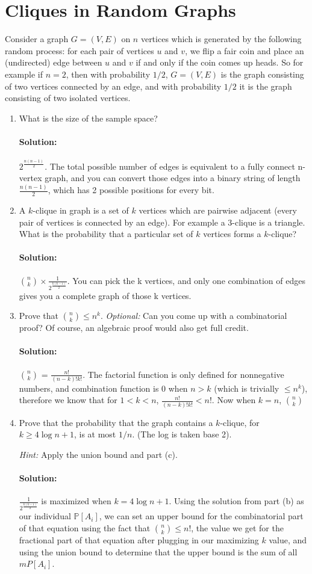 \documentclass[11pt, notitlepage]{article}
\newcommand{\mP}{\mathbb{P}}
\newcommand{\Question}[1]{\newpage\section{#1}}
\newenvironment{solution}{\paragraph{Solution:}}{\hfill \vspace{10mm}}
\begin{document}
\Question{Cliques in Random Graphs}

Consider a graph $G = (V,E)$ on $n$ vertices which is generated by the following random process: for each pair of vertices $u$ and $v$, we flip a fair coin and place an (undirected) edge between $u$ and $v$ if and only if the coin comes up heads. So for example if $n = 2$, then with probability $1/2$, $G = (V,E)$ is the graph consisting of two vertices connected by an edge, and with probability $1/2$ it is the graph consisting of two isolated vertices.

\begin{enumerate}[label=\alph*.)]
\item What is the size of the sample space?
\begin{solution}
	$2^{\frac{n(n-1)}{2}}$. The total possible number of edges is equivalent to a fully connect n-vertex graph, and you can convert those edges into a binary string of length $\frac{n(n-1)}{2}$, which has 2 possible positions for every bit.
\end{solution}
\item A $k$-clique in graph is a set of $k$ vertices which are pairwise adjacent (every pair of vertices is connected by an edge). For example a $3$-clique is a triangle. What is the probability that a particular
set of $k$ vertices forms a $k$-clique?
\begin{solution}
	${\binom n k}\times \frac{1}{2^{\frac{k(k-1)}{2}}}$. You can pick the k vertices, and only one combination of edges gives you a complete graph of those k vertices.
\end{solution}

\item Prove that ${n \choose k} \le n^k$.
\textit{Optional:} Can you come up with a combinatorial proof? Of course, an algebraic proof would also get full credit.

\begin{solution}
$n \choose k$ = $\frac{n!}{(n-k)!k!}$. The factorial function is only defined for nonnegative numbers, and combination function is 0 when $n > k$ (which is trivially $\leq n^k$), therefore we know that for $1<k<n$, $\frac{n!}{(n-k)!k!} < n!$. Now when $k=n$, $n \choose k$
\end{solution}


\item Prove that the probability that the graph contains a $k$-clique, for $k \geq 4{\log n}+1$, is at most
$1/n$. (The log is taken base 2).

	\textit{Hint:} Apply the union bound and part (c).
\begin{solution}
	$\frac{1}{2^{\frac{k(k-1)}{2}}}$ is maximized when $k=4\log{n} + 1$. Using the solution from part (b) as our individual $\mP[A_i]$, we can set an upper bound for the combinatorial part of that equation using the fact that $\binom n k \leq n!$, the value we get for the fractional part of that equation after plugging in our maximizing $k$ value, and using the union bound to determine that the upper bound is the sum of all $mP[A_i]$.
\end{solution}

\end{enumerate}
\end{document}
